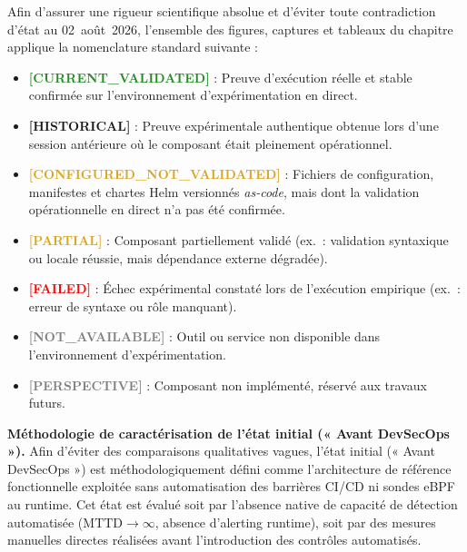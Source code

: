 \begin{tcolorbox}[colback=LightGray!20, colframe=clrBlue, arc=3pt, title={\small\bfseries Convention Visuelle de Classification des Preuves et États Expérimentaux}]
Afin d'assurer une rigueur scientifique absolue et d'éviter toute contradiction d'état au 02~août~2026, l'ensemble des figures, captures et tableaux du chapitre applique la nomenclature standard suivante :
\begin{itemize}[leftmargin=*]
    \item \textcolor{ForestGreen}{\textbf{[CURRENT\_VALIDATED]}} : Preuve d'exécution réelle et stable confirmée sur l'environnement d'expérimentation en direct.
    \item \textcolor{NavyBlue}{\textbf{[HISTORICAL]}} : Preuve expérimentale authentique obtenue lors d'une session antérieure où le composant était pleinement opérationnel.
    \item \textcolor{Goldenrod}{\textbf{[CONFIGURED\_NOT\_VALIDATED]}} : Fichiers de configuration, manifestes et chartes Helm versionnés \textit{as-code}, mais dont la validation opérationnelle en direct n'a pas été confirmée.
    \item \textcolor{Goldenrod}{\textbf{[PARTIAL]}} : Composant partiellement validé (ex.~: validation syntaxique ou locale réussie, mais dépendance externe dégradée).
    \item \textcolor{red}{\textbf{[FAILED]}} : Échec expérimental constaté lors de l'exécution empirique (ex.~: erreur de syntaxe ou rôle manquant).
    \item \textcolor{gray}{\textbf{[NOT\_AVAILABLE]}} : Outil ou service non disponible dans l'environnement d'expérimentation.
    \item \textcolor{gray}{\textbf{[PERSPECTIVE]}} : Composant non implémenté, réservé aux travaux futurs.
\end{itemize}
\end{tcolorbox}

\textbf{Méthodologie de caractérisation de l'état initial (« Avant DevSecOps »).} Afin d'éviter des comparaisons qualitatives vagues, l'état initial (« Avant DevSecOps ») est méthodologiquement défini comme l'architecture de référence fonctionnelle exploitée sans automatisation des barrières CI/CD ni sondes eBPF au runtime. Cet état est évalué soit par l'absence native de capacité de détection automatisée ($\text{MTTD} \rightarrow \infty$, absence d'alerting runtime), soit par des mesures manuelles directes réalisées avant l'introduction des contrôles automatisés.

